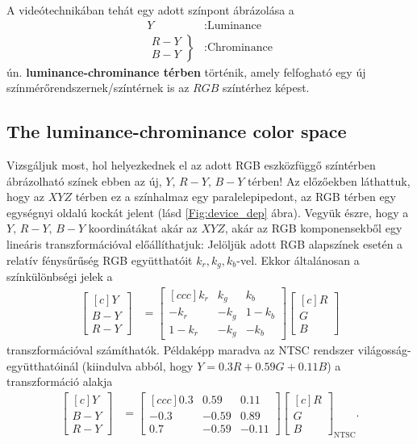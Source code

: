 A videótechnikában tehát egy adott színpont ábrázolása a
\begin{align*}
Y&: \text{Luminance }\\
 	\left.\begin{array}{lr}
        R-Y\\
        B-Y
        \end{array}\right\}&: \text{Chrominance}
\end{align*}
ún. \textbf{luminance-chrominance térben} történik, amely felfogható egy új színmérőrendszernek/színtérnek is az $RGB$ színtérhez képest.

\subsection{The luminance-chrominance color space}
Vizsgáljuk most, hol helyezkednek el az adott RGB eszközfüggő színtérben ábrázolható színek ebben az új, $Y,\, R-Y,\, B-Y$ térben!
Az előzőekben láthattuk, hogy az $XYZ$ térben ez a színhalmaz egy paralelepipedont, az RGB térben egy egységnyi oldalú kockát jelent (lásd \ref{Fig:device_dep} ábra).
Vegyük észre, hogy a $Y,\, R-Y,\, B-Y$ koordinátákat akár az $XYZ$, akár az RGB komponensekből egy lineáris transzformációval előállíthatjuk:
Jelöljük adott RGB alapszínek esetén a relatív fénysűrűség RGB együtthatóit $k_r, k_g, k_b$-vel.
Ekkor általánosan a színkülönbségi jelek a 
\begin{align}
\begin{bmatrix}[c]
       Y \\[0.3em]
       B - Y \\[0.3em]
       R - Y\end{bmatrix} &= 
\begin{bmatrix}[c c c]
      k_r &  k_g&  k_b  \\[0.3em]
      -k_r &  -k_g&  1-k_b  \\[0.3em]
      1-k_r &  -k_g&  -k_b \end{bmatrix} 
\begin{bmatrix}[c]
       R \\[0.3em]
       G \\[0.3em]
       B \end{bmatrix}
\end{align}
transzformációval számíthatók.
Példaképp maradva az NTSC rendszer világosság-együtthatóinál (kiindulva abból, hogy $Y = 0.3R + 0.59G + 0.11B$) a transzformáció alakja
\begin{align}
\begin{bmatrix}[c]
       Y \\[0.3em]
       B - Y \\[0.3em]
       R - Y \end{bmatrix} &= 
\begin{bmatrix}[c c c]
      0.3 &  0.59&  0.11  \\[0.3em]
       -0.3 &  -0.59 & 0.89  \\[0.3em]
      0.7 &  -0.59&  -0.11  \end{bmatrix} 
\begin{bmatrix}[c]
       R \\[0.3em]
       G \\[0.3em]
       B \end{bmatrix}_{\mathrm{NTSC}}.
\end{align}
